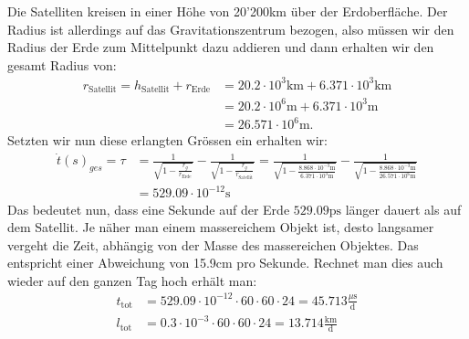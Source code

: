 \begin{refsection}
Die Satelliten kreisen in einer Höhe von 20'200km über der Erdoberfläche. Der Radius ist allerdings auf das Gravitationszentrum bezogen, also müssen wir den Radius der Erde zum Mittelpunkt dazu addieren und dann erhalten wir den gesamt Radius von:
\begin{align*}
r_{\text{Satellit}} = h_{\text{Satellit}} + r_{\text{Erde}} & = 20.2 \cdot 10^3\text{km} + 6.371 \cdot 10^3\text{km} 
\\
& = 20.2 \cdot 10^6\text{m} + 6.371 \cdot 10^3\text{m} 
\\
& = 26.571 \cdot 10^6\text{m}.
\end{align*}
Setzten wir nun diese erlangten Grössen ein erhalten wir:
\begin{align*}
\dot t(s)_ {ges} = \tau
&=
\frac{1}{\sqrt{\displaystyle 1-\frac{r_g}{r_\text{Erde}}}} - \frac{1}{\sqrt{\displaystyle 1-\frac{r_g}{r_{\text{Satellit}}}}}
= \frac{1}{\sqrt{\displaystyle 1-\frac{8.868 \cdot 10^{-3}\text{m}}{ 6.371 \cdot 10^3\text{m}}}} - \frac{1}{\sqrt{\displaystyle 1-\frac{8.868 \cdot 10^{-3}\text{m}}{ 26.571 \cdot 10^6\text{m}}}}
\\
&= 529.09 \cdot 10^{-12}\text{s}
\end{align*}
Das bedeutet nun, dass eine Sekunde auf der Erde \( 529.09\text{ps} \) länger dauert als auf dem Satellit. Je näher man einem massereichem Objekt ist, desto langsamer vergeht die Zeit, abhängig von der Masse des massereichen Objektes. Das entspricht einer Abweichung von 15.9cm pro Sekunde. Rechnet man dies auch wieder auf den ganzen Tag hoch erhält man:
\begin{align*}
t_{\text{tot}} & = 529.09 \cdot 10^{-12} \cdot 60 \cdot 60 \cdot 24 = 45.713\frac{\mu{}\text{s}}{\text{d}}
\\
l_{\text{tot}} &= 0.3 \cdot 10^{-3} \cdot 60 \cdot 60 \cdot 24 = 13.714\frac{\text{km}}{\text{d}}
\end{align*}


\end{refsection}
